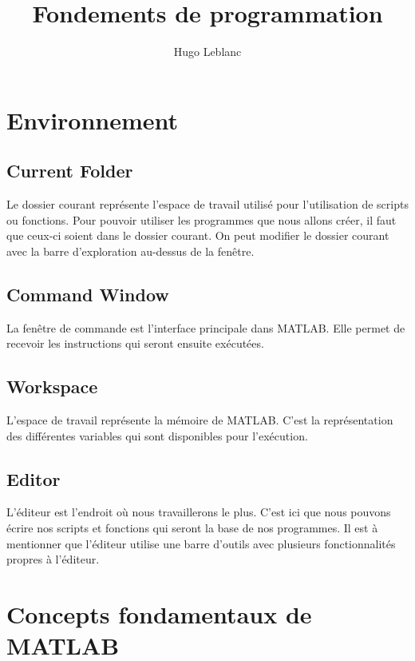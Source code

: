 \documentclass{tufte-handout}
\title{Fondements de programmation}
\author{Hugo Leblanc}
\begin{document}
\maketitle

\section{Environnement}
\subsection{Current Folder}
Le dossier courant représente l'espace de travail utilisé pour l'utilisation de scripts ou fonctions. Pour pouvoir utiliser les programmes que nous allons créer, il faut que ceux-ci soient dans le dossier courant. On peut modifier le dossier courant avec la barre d'exploration au-dessus de la fenêtre.
\subsection{Command Window}
La fenêtre de commande est l'interface principale dans MATLAB. Elle permet de recevoir les instructions qui seront ensuite exécutées.
\subsection{Workspace}
L'espace de travail représente la mémoire de MATLAB. C'est la représentation des différentes variables qui sont disponibles pour l'exécution.
\subsection{Editor}
L'éditeur est l'endroit où nous travaillerons le plus. C'est ici que nous pouvons écrire nos scripts et fonctions qui seront la base de nos programmes. Il est à mentionner que l'éditeur utilise une barre d'outils avec plusieurs fonctionnalités propres à l'éditeur.

\section{Concepts fondamentaux de MATLAB}
\end{document}
